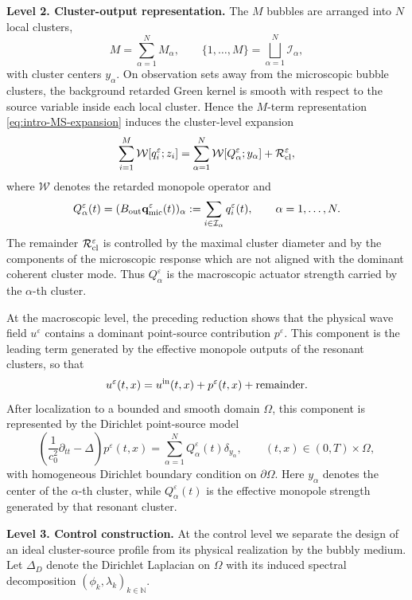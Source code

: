 \documentclass[11pt,a4paper]{article}
\numberwithin{equation}{section}
\begin{document}
\medskip
\noindent
\textbf{Level 2. Cluster-output representation.}
The $M$ bubbles are arranged into $N$ local clusters,
\[
        M=\sum_{\alpha=1}^N M_\alpha,
        \qquad
        \{1,\ldots,M\}=\bigsqcup_{\alpha=1}^N \mathcal I_\alpha,
\]
with cluster centers $y_\alpha$. On observation sets away from the microscopic bubble clusters, the background retarded Green kernel is smooth with respect to the source variable inside each local cluster. Hence the $M$-term representation \eqref{eq:intro-MS-expansion} induces the cluster-level expansion
\begin{equation}
\label{eq:intro-cluster-output-expansion}
   \sum_{i=1}^M \mathcal W[q_i^\varepsilon;z_i]
   =
   \sum_{\alpha=1}^N \mathcal W[Q_\alpha^\varepsilon;y_\alpha]
   +\mathcal R_{\rm cl}^\varepsilon,
\end{equation}
where $\mathcal W$ denotes the retarded monopole operator and
\begin{equation}
\label{eq:intro-cluster-output-map}
        Q_\alpha^\varepsilon(t)
        =(B_{\rm out}\mathbf q_{\rm mic}^\varepsilon(t))_\alpha
        :=\sum_{i\in\mathcal I_\alpha}q_i^\varepsilon(t),
        \qquad \alpha=1,\ldots,N.
\end{equation}
The remainder $\mathcal R_{\rm cl}^\varepsilon$ is controlled by the maximal cluster diameter and by the components of the microscopic response which are not aligned with the dominant coherent cluster mode.
Thus $Q_\alpha^\varepsilon$ is the macroscopic actuator strength carried by the $\alpha$-th cluster.
\bigskip

\noindent At the macroscopic level, the preceding reduction shows that the physical wave
field \(u^\varepsilon\) contains a dominant point-source contribution
\(p^\varepsilon\). This component is the leading term generated by the
effective monopole outputs of the resonant clusters, so that
\[
u^\varepsilon(t,x)
=
u^{\rm in}(t,x)+p^\varepsilon(t,x)+\text{remainder}.
\]
After localization to a bounded and smooth domain \(\Omega\), this component is represented by the
Dirichlet point-source model
\[
\left(\frac{1}{c_0^2}\partial_{tt}-\Delta\right)p^\varepsilon(t,x)
=
\sum_{\alpha=1}^{N} Q_\alpha^\varepsilon(t)\delta_{y_\alpha},
\qquad (t,x)\in (0,T)\times\Omega,
\]
with homogeneous Dirichlet boundary condition on \(\partial\Omega\). Here
\(y_\alpha\) denotes the center of the \(\alpha\)-th cluster, while
\(Q_\alpha^\varepsilon(t)\) is the effective monopole strength generated by
that resonant cluster. 
\bigskip

\noindent
\textbf{Level 3. Control construction.}
At the control level we separate the design of an ideal cluster-source profile from its physical realization by the bubbly medium. Let
\(\Delta_D\) denote the Dirichlet Laplacian on \(\Omega\) with its induced spectral decomposition $(\phi_k, \lambda_k)_{k\in \mathbb{N}}$.
\end{document}
